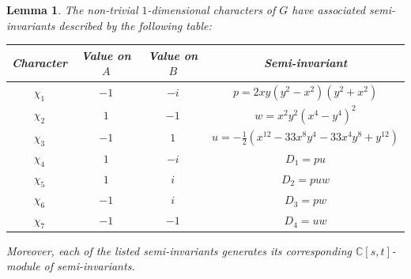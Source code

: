 \documentclass[a4paper,reqno]{amsart}
\newtheorem{lemma}[theorem]{Lemma}
\theoremstyle{definition}
\theoremstyle{remark} \newtheorem{remark}[theorem]{Remark}
\numberwithin{equation}{section}
\begin{document}
\begin{lemma}\label{semi-invGI}
    The non-trivial \(1\)-dimensional characters of \(G\) have associated semi-invariants described by the following table:
    \begin{center}
        \begin{tabular}{|c|c|c|c|}
            \hline
             Character & Value on \(A\) & Value on \(B\) & Semi-invariant \\ \hline
             \(\chi_1\) & \(-1\) & \(-i\) & \(p = 2xy(y^2-x^2)(y^2+x^2)\) \\
             \(\chi_2\) & \(1\) & \(-1\) & \(w = x^2y^2(x^4-y^4)^2\) \\ 
             \(\chi_3\) & \(-1\) & \(1\) & \(u = -\frac{1}{2}(x^{12} - 33x^8y^4 - 33x^4y^8 + y^{12})\) \\ 
             \(\chi_4\) & \(1\) & \(-i\) & \(D_1 = pu\) \\ 
             \(\chi_5\) & \(1\) & \(i\) & \(D_2 = puw\) \\ 
             \(\chi_6\) & \(-1\) & \(i\) & \(D_3 = pw\) \\ 
             \(\chi_7\) & \(-1\) & \(-1\) & \(D_4 = uw\) \\ 
             \hline
        \end{tabular}
    \end{center}
    Moreover, each of the listed semi-invariants generates its corresponding \(\mathbb{C}[s,t]\)-module of semi-invariants.
\end{lemma}
\end{document}
